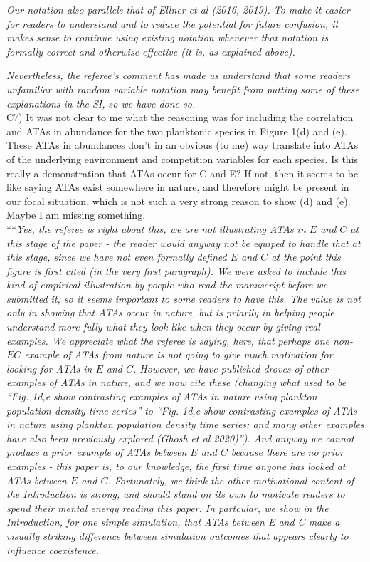 \documentclass[letterpaper,11pt]{article}
\begin{document}
\emph{Our notation also parallels that of Ellner et al (2016, 2019). To make it
easier for readers to understand and to reduce the potential for future confusion, it makes sense to continue
using existing notation whenever that notation is formally correct and otherwise effective (it is, as explained above).}

\emph{Nevertheless, the referee's comment has made us understand that some readers unfamiliar with random variable 
notation may benefit from putting some
of these explanations in the SI, so we have done so.} \\

\noindent C7) It was not clear to me what the reasoning was for including the correlation and ATAs in abundance for the two planktonic species in Figure 1(d) and (e).  These ATAs in abundances don't in an obvious (to me) way translate into ATAs of the underlying environment and competition variables for each species. Is this really a demonstration that ATAs occur for C and E?  If not, then it seems to be like saying ATAs exist somewhere in nature, and therefore might be present in our focal situation, which is not such a very strong reason to show (d) and (e).  Maybe I am missing something. \\

\noindent ***\emph{Yes, the referee is right about this, we are not illustrating ATAs in $E$ and $C$ at this stage of the 
paper - the reader would anyway not be equiped to handle that at this stage, since we have not even formally defined 
$E$ and $C$ at the point this figure is first cited (in the very first paragraph). 
We were asked to include this kind of empirical illustration 
by poeple who read the manuscript before we submitted it, so it seems important to some readers to have this. 
The value is not only in showing that ATAs occur in nature, but is priarily  
in helping people understand more fully what they look like when they occur by giving real examples. 
We appreciate what the referee is saying,
here, that perhaps one non-$EC$ example of ATAs from nature is not going
to give much motivation for looking for ATAs in $E$ and $C$. However, we have published droves of other examples of
ATAs in nature, and we now cite these (changing what used to be ``Fig. 1d,e show contrasting examples of ATAs in nature
using plankton population density time series'' to ``Fig. 1d,e show contrasting examples of ATAs in nature
using plankton population density time series; and many other examples have also been previously explored (Ghosh et al 2020)''). 
And anyway we cannot produce a prior example of ATAs between $E$ and $C$ because there are no prior examples - this paper 
is, to our
knowledge, the first time anyone has looked at ATAs between $E$ and $C$. Fortunately, we think the other motivational
content of the Introduction is strong, and should stand on its own to motivate readers to spend their mental 
energy reading this paper. In partcular, we show in the Introduction, for one simple simulation, that ATAs between E and
C make a visually striking difference between simulation outcomes that appears clearly to influence coexistence.} \\
\end{document}

